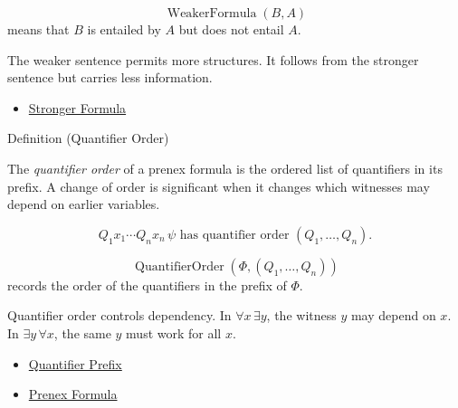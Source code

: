 \begin{remark*}
\[
  \operatorname{WeakerFormula}(B,A)
\] means that \(B\) is entailed by \(A\) but
does not entail \(A\).
\end{remark*}

\begin{remark*}[Interpretation]
The weaker sentence permits more structures. It follows from the stronger
sentence but carries less information.
\end{remark*}

\begin{dependencies}
\begin{itemize}
  \item \hyperref[def:strength]{Stronger Formula}
\end{itemize}
\end{dependencies}

\begin{definitionbox}{Definition (Quantifier Order)}
\begin{definition}
\label{def:q-alt}
The \emph{quantifier order} of a prenex formula is the ordered list of
quantifiers in its prefix. A change of order is significant when it changes
which witnesses may depend on earlier variables.
\end{definition}
\end{definitionbox}

\begin{remark*}
\[
Q_1x_1\cdots Q_nx_n\,\psi
\text{ has quantifier order }
(Q_1,\ldots,Q_n).
\]
\end{remark*}

\begin{remark*}
\[
  \operatorname{QuantifierOrder}(\Phi,(Q_1,\ldots,Q_n))
\] records the order of
the quantifiers in the prefix of \(\Phi\).
\end{remark*}

\begin{remark*}[Interpretation]
Quantifier order controls dependency. In \(\forall x\,\exists y\), the witness
\(y\) may depend on \(x\). In \(\exists y\,\forall x\), the same \(y\) must work
for all \(x\).
\end{remark*}

\begin{dependencies}
\begin{itemize}
  \item \hyperref[def:quantifier-prefix]{Quantifier Prefix}
  \item \hyperref[def:prenex-formula]{Prenex Formula}
\end{itemize}
\end{dependencies}

